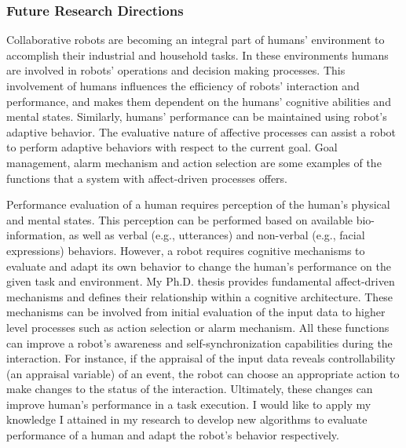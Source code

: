 \documentclass[a4paper, 11pt]{article}
\begin{document}
\begin{small}
\subsubsection*{Future Research Directions}

Collaborative robots are becoming an integral part of humans' environment to
accomplish their industrial and household tasks. In these environments humans
are involved in robots' operations and decision making processes. This
involvement of humans influences the efficiency of robots' interaction and
performance, and makes them dependent on the humans' cognitive abilities and
mental states. Similarly, humans' performance can be maintained using robot's
adaptive behavior. The evaluative nature of affective processes can assist a
robot to perform adaptive behaviors with respect to the current goal. Goal
management, alarm mechanism and action selection are some examples of the
functions that a system with affect-driven processes offers.

Performance evaluation of a human requires perception of the human's physical
and mental states. This perception can be performed based on available
bio-information, as well as verbal (e.g., utterances) and non-verbal (e.g.,
facial expressions) behaviors. However, a robot requires cognitive mechanisms to
evaluate and adapt its own behavior to change the human's performance on the
given task and environment. My Ph.D. thesis provides fundamental affect-driven
mechanisms and defines their relationship within a cognitive architecture. These
mechanisms can be involved from initial evaluation of the input data to higher
level processes such as action selection or alarm mechanism. All these functions
can improve a robot's awareness and self-synchronization capabilities during the
interaction. For instance, if the appraisal of the input data reveals
controllability (an appraisal variable) of an event, the robot can choose an
appropriate action to make changes to the status of the interaction. Ultimately,
these changes can improve human's performance in a task execution. I would like
to apply my knowledge I attained in my research to develop new algorithms to
evaluate performance of a human and adapt the robot's behavior respectively.






\vspace{0.5cm}

\end{small}
\end{document}
